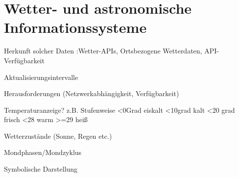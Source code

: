 \section{Wetter- und astronomische Informationssysteme} 
Herkunft solcher Daten :Wetter-APIs, Ortsbezogene Wetterdaten, API-Verfügbarkeit

Aktualisierungsintervalle

Herausforderungen (Netzwerkabhängigkeit, Verfügbarkeit)

Temperaturanzeige? z.B. Stufenweise <0Grad eiskalt <10grad kalt <20 grad frisch <28 warm >=29 heiß

Wetterzustände (Sonne, Regen etc.)

Mondphasen/Mondzyklus

Symbolische Darstellung